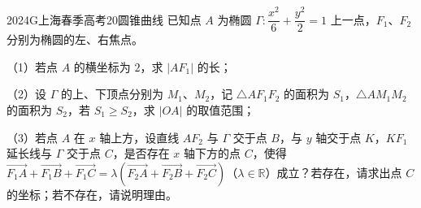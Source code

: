
\begin{problem}{2024}{G}{上海春季高考}{20}{圆锥曲线}
已知点 $A$ 为椭圆 $\Gamma:\dfrac{x^2}{6}+\dfrac{y^2}{2}=1$ 上一点，$F_1$、$F_2$ 分别为椭圆的左、右焦点。

（1）若点 $A$ 的横坐标为 $2$，求 $|AF_1|$ 的长；

（2）设 $\Gamma$ 的上、下顶点分别为 $M_1$、$M_2$，记 $\triangle AF_1F_2$ 的面积为 $S_1$，$\triangle AM_1M_2$ 的面积为 $S_2$，若 $S_1\ge S_2$，求 $|OA|$ 的取值范围；

（3）若点 $A$ 在 $x$ 轴上方，设直线 $AF_2$ 与 $\Gamma$ 交于点 $B$，与 $y$ 轴交于点 $K$，$KF_1$ 延长线与 $\Gamma$ 交于点 $C$，是否存在 $x$ 轴下方的点 $C$，使得 $\overrightarrow{F_1A}+\overrightarrow{F_1B}+\overrightarrow{F_1C}=\lambda(\overrightarrow{F_2A}+\overrightarrow{F_2B}+\overrightarrow{F_2C})$（$\lambda\in\mathbb{R}$）成立？若存在，请求出点 $C$ 的坐标；若不存在，请说明理由。
\end{problem}
